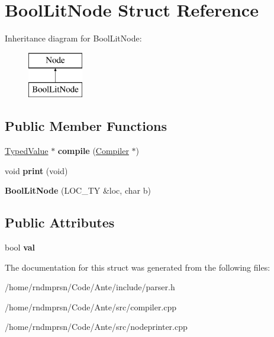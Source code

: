 \hypertarget{structBoolLitNode}{}\section{Bool\+Lit\+Node Struct Reference}
\label{structBoolLitNode}
Inheritance diagram for Bool\+Lit\+Node\+:\begin{figure}[H]
\begin{center}
\leavevmode
\includegraphics[height=2.000000cm]{structBoolLitNode}
\end{center}
\end{figure}
\subsection*{Public Member Functions}
\begin{DoxyCompactItemize}
\item 
\mbox{\label{structBoolLitNode_ac5ba1a0bd325de9972ca84e67174eea2}} 
\hyperlink{structTypedValue}{Typed\+Value} $\ast$ {\bfseries compile} (\hyperlink{structante_1_1Compiler}{Compiler} $\ast$)
\item 
\mbox{\label{structBoolLitNode_a318a3292e32288c1ebcde3113e86b797}} 
void {\bfseries print} (void)
\item 
\mbox{\label{structBoolLitNode_a7ee988f0500b39bd3d604141b6aff8f2}} 
{\bfseries Bool\+Lit\+Node} (L\+O\+C\+\_\+\+TY \&loc, char b)
\end{DoxyCompactItemize}
\subsection*{Public Attributes}
\begin{DoxyCompactItemize}
\item 
\mbox{\label{structBoolLitNode_a26dcb72cf365e3eaf84c1a59e5599ee3}} 
bool {\bfseries val}
\end{DoxyCompactItemize}


The documentation for this struct was generated from the following files\+:\begin{DoxyCompactItemize}
\item 
/home/rndmprsn/\+Code/\+Ante/include/parser.\+h\item 
/home/rndmprsn/\+Code/\+Ante/src/compiler.\+cpp\item 
/home/rndmprsn/\+Code/\+Ante/src/nodeprinter.\+cpp\end{DoxyCompactItemize}
